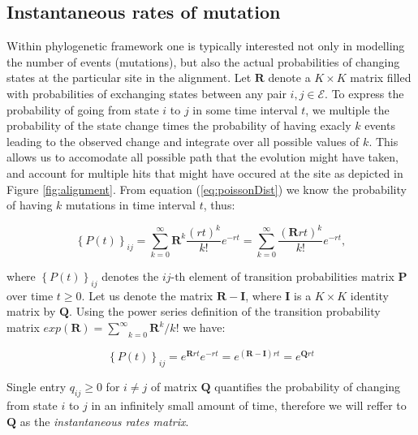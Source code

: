 \documentclass[12pt,twoside]{mitthesis}
\theoremstyle{plain}
\theoremstyle{definition}
\theoremstyle{remark}
\begin{document}

\subsection{Instantaneous rates of mutation}

Within phylogenetic framework one is typically interested not only in modelling the number of events (mutations), but also the actual probabilities of changing states at the particular site in the alignment. 
Let $\mathbf{R}$ denote a $K \times K$ matrix filled with probabilities of exchanging states between any pair $i,j\in \mathcal{E}$.
To express the probability of going from state $i$ to $j$ in some time interval $t$, we multiple the probability of the state change times the probability of having exacly $k$ events leading to the observed change and integrate over all possible values of $k$.
This allows us to accomodate all possible path that the evolution might have taken, and account for multiple hits that might have occured at the site as depicted in Figure \ref{fig:alignment}.
From equation (\ref{eq:poissonDist}) we know the probability of having $k$ mutations in time interval $t$, thus:

\begin{equation}
\left\{ P(t)\right\} _{ij}=\underset{k=0}{\overset{\infty}{\sum}}\mathbf{R}^{k}\frac{(r t)^{k}}{k!}e^{-r t}=\underset{k=0}{\overset{\infty}{\sum}}\frac{(\mathbf{R}r t)^{k}}{k!}e^{-r t},
\end{equation}

\noindent
where $\left\{ P(t)\right\} _{ij}$ denotes the $ij\text{-th}$ element of transition probabilities matrix $\mathbf{P}$ over time $t \geq 0$.
Let us denote the matrix $\mathbf{R}-\mathbf{I}$, where $\mathbf{I}$ is a $K \times K$ identity matrix by $\mathbf{Q}$.
Using the power series definition of the transition probability matrix $exp(\mathbf{R})=\underset{k=0}{\overset{\infty}{\sum}}\mathbf{R}^{k}/k!$ we have:

\begin{equation}
\left\{ P(t)\right\} _{ij}=e^{\mathbf{R}r t}e^{-r t} =e^{(\mathbf{R}-\mathbf{I})r t}=e^{\mathbf{Q}r t} 
\label{eq:matrixExp}
\end{equation}

\noindent
Single entry $q_{ij} \ge 0$ for $i \neq j$ of matrix $\mathbf{Q}$ quantifies the probability of changing from state $i$ to $j$ in an infinitely small amount of time, therefore we will reffer to $\mathbf{Q}$ as the \emph{instantaneous rates matrix}.
\end{document}
